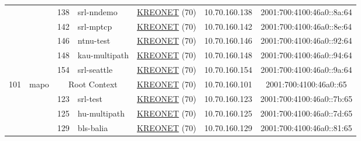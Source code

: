 \begin{small}
\begin{center}
\begin{longtable}{|c|c|c|c|c|c|c|c|}
  &  & \tiny{138} & \multicolumn{1}{|l|}{\tiny{srl-nndemo}} & \multicolumn{2}{|c|}{\tiny{\href{http://www.kreonet.net}{KREONET} (70)}} & \tiny{10.70.160.138} & \tiny{2001:700:4100:46a0::8a:64} \\* \cline{3-3}\cline{4-4}\cline{5-5}\cline{6-6}\cline{7-7}\cline{8-8}
  &  & \tiny{142} & \multicolumn{1}{|l|}{\tiny{srl-mptcp}} & \multicolumn{2}{|c|}{\tiny{\href{http://www.kreonet.net}{KREONET} (70)}} & \tiny{10.70.160.142} & \tiny{2001:700:4100:46a0::8e:64} \\* \cline{3-3}\cline{4-4}\cline{5-5}\cline{6-6}\cline{7-7}\cline{8-8}
  &  & \tiny{146} & \multicolumn{1}{|l|}{\tiny{ntnu-test}} & \multicolumn{2}{|c|}{\tiny{\href{http://www.kreonet.net}{KREONET} (70)}} & \tiny{10.70.160.146} & \tiny{2001:700:4100:46a0::92:64} \\* \cline{3-3}\cline{4-4}\cline{5-5}\cline{6-6}\cline{7-7}\cline{8-8}
  &  & \tiny{148} & \multicolumn{1}{|l|}{\tiny{kau-multipath}} & \multicolumn{2}{|c|}{\tiny{\href{http://www.kreonet.net}{KREONET} (70)}} & \tiny{10.70.160.148} & \tiny{2001:700:4100:46a0::94:64} \\* \cline{3-3}\cline{4-4}\cline{5-5}\cline{6-6}\cline{7-7}\cline{8-8}
  &  & \tiny{154} & \multicolumn{1}{|l|}{\tiny{srl-seattle}} & \multicolumn{2}{|c|}{\tiny{\href{http://www.kreonet.net}{KREONET} (70)}} & \tiny{10.70.160.154} & \tiny{2001:700:4100:46a0::9a:64} \\ \hline
 \multirow{12}{*}{\tiny{101}} & \multicolumn{1}{|l|}{\multirow{12}{*}{\tiny{mapo}}} & \multicolumn{2}{|c|}{\tiny{Root Context}} & \multicolumn{2}{|c|}{\tiny{\href{http://www.kreonet.net}{KREONET} (70)}} & \tiny{10.70.160.101} & \tiny{2001:700:4100:46a0::65} \\* \cline{3-3}\cline{4-4}\cline{5-5}\cline{6-6}\cline{7-7}\cline{8-8}
  &  & \tiny{123} & \multicolumn{1}{|l|}{\tiny{srl-test}} & \multicolumn{2}{|c|}{\tiny{\href{http://www.kreonet.net}{KREONET} (70)}} & \tiny{10.70.160.123} & \tiny{2001:700:4100:46a0::7b:65} \\* \cline{3-3}\cline{4-4}\cline{5-5}\cline{6-6}\cline{7-7}\cline{8-8}
  &  & \tiny{125} & \multicolumn{1}{|l|}{\tiny{hu-multipath}} & \multicolumn{2}{|c|}{\tiny{\href{http://www.kreonet.net}{KREONET} (70)}} & \tiny{10.70.160.125} & \tiny{2001:700:4100:46a0::7d:65} \\* \cline{3-3}\cline{4-4}\cline{5-5}\cline{6-6}\cline{7-7}\cline{8-8}
  &  & \tiny{129} & \multicolumn{1}{|l|}{\tiny{bls-balia}} & \multicolumn{2}{|c|}{\tiny{\href{http://www.kreonet.net}{KREONET} (70)}} & \tiny{10.70.160.129} & \tiny{2001:700:4100:46a0::81:65} \\* \cline{3-3}\cline{4-4}\cline{5-5}\cline{6-6}\cline{7-7}\cline{8-8}

\end{longtable}
\end{center}
\end{small}
